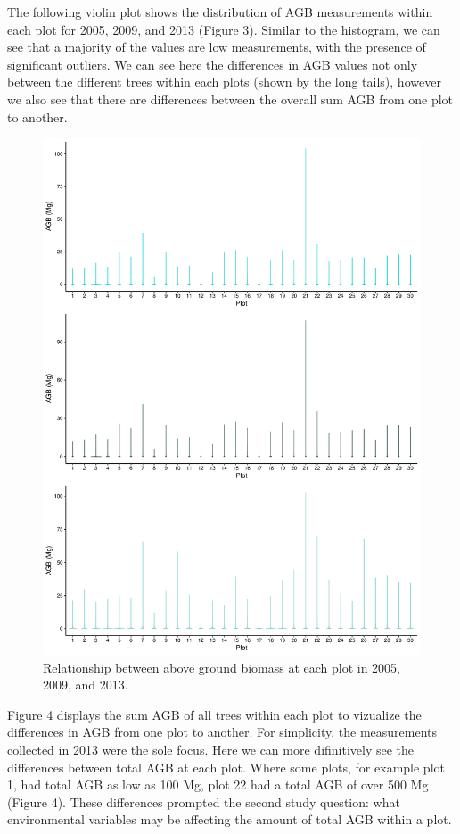 \documentclass[12pt,]{article}
\begin{document}
The following violin plot shows the distribution of AGB measurements
within each plot for 2005, 2009, and 2013 (Figure 3). Similar to the
histogram, we can see that a majority of the values are low
measurements, with the presence of significant outliers. We can see here
the differences in AGB values not only between the different trees
within each plots (shown by the long tails), however we also see that
there are differences between the overall sum AGB from one plot to
another.

\begin{figure}
\centering
\includegraphics{Project_Template_files/figure-latex/dataviz_2013-1.pdf}
\caption{Relationship between above ground biomass at each plot in 2005,
2009, and 2013.}
\end{figure}

\newpage

Figure 4 displays the sum AGB of all trees within each plot to vizualize
the differences in AGB from one plot to another. For simplicity, the
measurements collected in 2013 were the sole focus. Here we can more
difinitively see the differences between total AGB at each plot. Where
some plots, for example plot 1, had total AGB as low as 100 Mg, plot 22
had a total AGB of over 500 Mg (Figure 4). These differences prompted
the second study question: what environmental variables may be affecting
the amount of total AGB within a plot.
\end{document}
